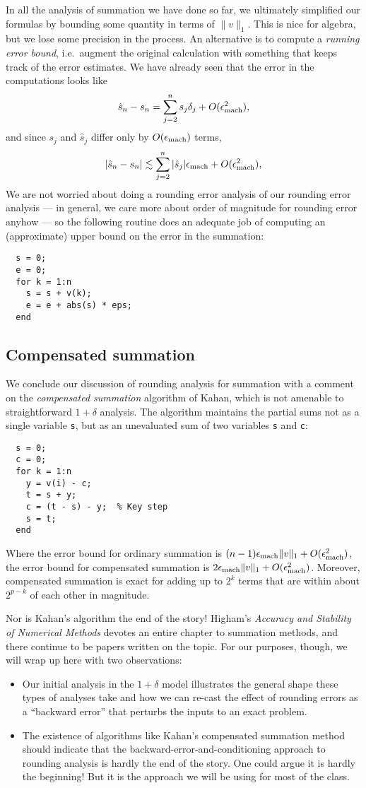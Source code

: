 \documentclass[12pt, leqno]{article} %
\begin{document}
In all the analysis of summation we have done so far, we ultimately
simplified our formulas by bounding some quantity in terms of $\|v\|_1$.
This is nice for algebra, but we lose some precision in the process.
An alternative is to compute a {\em running error bound}, i.e.~augment
the original calculation with something that keeps track of the error
estimates.  We have already seen that the error in the computations
looks like
\[
  \hat{s}_n-s_n = \sum_{j=2}^n s_j \delta_j + O(\epsilon_{\mathrm{mach}}^2),
\]
and since $s_j$ and $\hat{s}_j$ differ only by $O(\epsilon_{\mathrm{mach}})$ terms,
\[
  |\hat{s}_n-s_n| \lesssim \sum_{j=2}^n |\hat{s}_j| \epsilon_{\mathrm{mach}} + O(\epsilon_{\mathrm{mach}}^2),
\]
We are not worried about doing a rounding error analysis of our rounding
error analysis --- in general, we care more about order of magnitude for
rounding error anyhow --- so the following routine does an adequate job
of computing an (approximate) upper bound on the error in the summation:
\begin{lstlisting}
  s = 0;
  e = 0;
  for k = 1:n
    s = s + v(k);
    e = e + abs(s) * eps;
  end
\end{lstlisting}

\subsection{Compensated summation}

We conclude our discussion of rounding analysis for summation
with a comment on the {\em compensated summation} algorithm of
Kahan, which is not amenable to straightforward $1+\delta$ analysis.
The algorithm maintains the partial sums not as a single variable
{\tt s}, but as an unevaluated sum of two
variables {\tt s} and {\tt c}:
\begin{lstlisting}
  s = 0;
  c = 0;
  for k = 1:n
    y = v(i) - c;
    t = s + y;
    c = (t - s) - y;  % Key step
    s = t;
  end
\end{lstlisting}
Where the error bound for ordinary summation is
$(n-1) \epsilon_{\mathrm{mach}} \|v\|_1 + O(\epsilon_{\mathrm{mach}}^2)$,
the error bound for compensated summation is
$2 \epsilon_{\mathrm{mach}} \|v\|_1 + O(\epsilon_{\mathrm{mach}}^2)$.  Moreover,
compensated summation is exact for adding up to $2^k$
terms that are within about $2^{p-k}$ of each other
in magnitude.

Nor is Kahan's algorithm the end of the story!
Higham's {\em Accuracy and Stability of Numerical Methods}
devotes an entire chapter to summation methods, and there
continue to be papers written on the topic.  For our purposes,
though, we will wrap up here with two observations:
\begin{itemize}
\item Our initial analysis in the $1+\delta$ model illustrates the
  general shape these types of analyses take and how we can re-cast
  the effect of rounding errors as a ``backward error'' that perturbs
  the inputs to an exact problem.
\item The existence of algorithms like Kahan's compensated summation
  method should indicate that the backward-error-and-conditioning
  approach to rounding analysis is hardly the end of the story.
  One could argue it is hardly the beginning!  But it is the approach
  we will be using for most of the class.
\end{itemize}
\end{document}
